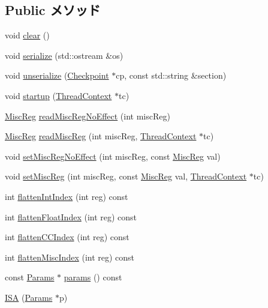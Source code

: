 \subsection*{Public メソッド}
\begin{DoxyCompactItemize}
\item 
void \hyperlink{classSparcISA_1_1ISA_ac8bb3912a3ce86b15842e79d0b421204}{clear} ()
\item 
void \hyperlink{classSparcISA_1_1ISA_a53e036786d17361be4c7320d39c99b84}{serialize} (std::ostream \&os)
\item 
void \hyperlink{classSparcISA_1_1ISA_af22e5d6d660b97db37003ac61ac4ee49}{unserialize} (\hyperlink{classCheckpoint}{Checkpoint} $\ast$cp, const std::string \&section)
\item 
void \hyperlink{classSparcISA_1_1ISA_a769e733729615c529fdb54f538f11dba}{startup} (\hyperlink{classThreadContext}{ThreadContext} $\ast$tc)
\item 
\hyperlink{namespaceSparcISA_aa16539aa6584fd12f7d6fa868f75b4de}{MiscReg} \hyperlink{classSparcISA_1_1ISA_a8147f1448b78d0de3f86766175429e19}{readMiscRegNoEffect} (int miscReg)
\item 
\hyperlink{namespaceSparcISA_aa16539aa6584fd12f7d6fa868f75b4de}{MiscReg} \hyperlink{classSparcISA_1_1ISA_ac9a5ba47c1dd9552c65c3164fba45f20}{readMiscReg} (int miscReg, \hyperlink{classThreadContext}{ThreadContext} $\ast$tc)
\item 
void \hyperlink{classSparcISA_1_1ISA_ae0c0c2b6f950ae0716dd72d9ecc38b18}{setMiscRegNoEffect} (int miscReg, const \hyperlink{namespaceSparcISA_aa16539aa6584fd12f7d6fa868f75b4de}{MiscReg} val)
\item 
void \hyperlink{classSparcISA_1_1ISA_a74734f9fecafa198d6a4881f65992ee3}{setMiscReg} (int miscReg, const \hyperlink{namespaceSparcISA_aa16539aa6584fd12f7d6fa868f75b4de}{MiscReg} val, \hyperlink{classThreadContext}{ThreadContext} $\ast$tc)
\item 
int \hyperlink{classSparcISA_1_1ISA_aece4b88ffcab608652e8e9f0fbe643d4}{flattenIntIndex} (int reg) const 
\item 
int \hyperlink{classSparcISA_1_1ISA_a85addcd4f57c5a0ffa81805dcad1eeb7}{flattenFloatIndex} (int reg) const 
\item 
int \hyperlink{classSparcISA_1_1ISA_a7a5d7476bd10e5af09e6e753d1fca087}{flattenCCIndex} (int reg) const 
\item 
int \hyperlink{classSparcISA_1_1ISA_a8997760aa4425793911f57440a4dd8ae}{flattenMiscIndex} (int reg) const 
\item 
const \hyperlink{classSparcISA_1_1ISA_ac7cac3e1b138ac21b8c4fddb4d68ed25}{Params} $\ast$ \hyperlink{classSparcISA_1_1ISA_a920ae59e79267fe19ed92248b3807e8d}{params} () const 
\item 
\hyperlink{classSparcISA_1_1ISA_ae9132e021b3f3b20c917fc328a056bbd}{ISA} (\hyperlink{classSparcISA_1_1ISA_ac7cac3e1b138ac21b8c4fddb4d68ed25}{Params} $\ast$p)
\end{DoxyCompactItemize}
